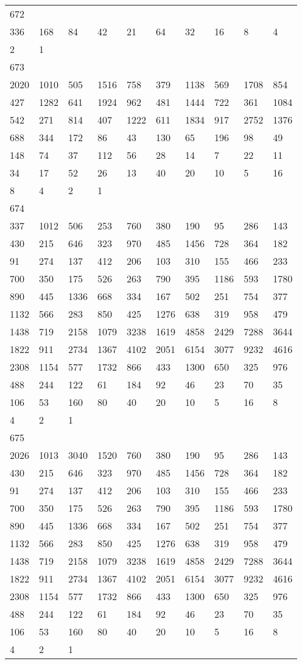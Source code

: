 \begin{longtable}{*{10}{l}}
672&&&&&&&&&\\
336& 168& 84& 42& 21& 64& 32& 16& 8& 4\\
2& 1& \\

673&&&&&&&&&\\
2020& 1010& 505& 1516& 758& 379& 1138& 569& 1708& 854\\
427& 1282& 641& 1924& 962& 481& 1444& 722& 361& 1084\\
542& 271& 814& 407& 1222& 611& 1834& 917& 2752& 1376\\
688& 344& 172& 86& 43& 130& 65& 196& 98& 49\\
148& 74& 37& 112& 56& 28& 14& 7& 22& 11\\
34& 17& 52& 26& 13& 40& 20& 10& 5& 16\\
8& 4& 2& 1& \\

674&&&&&&&&&\\
337& 1012& 506& 253& 760& 380& 190& 95& 286& 143\\
430& 215& 646& 323& 970& 485& 1456& 728& 364& 182\\
91& 274& 137& 412& 206& 103& 310& 155& 466& 233\\
700& 350& 175& 526& 263& 790& 395& 1186& 593& 1780\\
890& 445& 1336& 668& 334& 167& 502& 251& 754& 377\\
1132& 566& 283& 850& 425& 1276& 638& 319& 958& 479\\
1438& 719& 2158& 1079& 3238& 1619& 4858& 2429& 7288& 3644\\
1822& 911& 2734& 1367& 4102& 2051& 6154& 3077& 9232& 4616\\
2308& 1154& 577& 1732& 866& 433& 1300& 650& 325& 976\\
488& 244& 122& 61& 184& 92& 46& 23& 70& 35\\
106& 53& 160& 80& 40& 20& 10& 5& 16& 8\\
4& 2& 1& \\

675&&&&&&&&&\\
2026& 1013& 3040& 1520& 760& 380& 190& 95& 286& 143\\
430& 215& 646& 323& 970& 485& 1456& 728& 364& 182\\
91& 274& 137& 412& 206& 103& 310& 155& 466& 233\\
700& 350& 175& 526& 263& 790& 395& 1186& 593& 1780\\
890& 445& 1336& 668& 334& 167& 502& 251& 754& 377\\
1132& 566& 283& 850& 425& 1276& 638& 319& 958& 479\\
1438& 719& 2158& 1079& 3238& 1619& 4858& 2429& 7288& 3644\\
1822& 911& 2734& 1367& 4102& 2051& 6154& 3077& 9232& 4616\\
2308& 1154& 577& 1732& 866& 433& 1300& 650& 325& 976\\
488& 244& 122& 61& 184& 92& 46& 23& 70& 35\\
106& 53& 160& 80& 40& 20& 10& 5& 16& 8\\
4& 2& 1& \\


\end{longtable}
